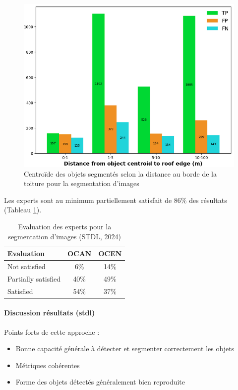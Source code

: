 \begin{figure}[H]
    \centering
    \includegraphics[width=1\linewidth]{02-main//figures/ch2/stdl_11_segmentation_image_distance.png}
    \caption{Centroïde des objets segmentés selon la distance au borde de la toiture pour la segmentation d’images  \cite{herny_detection_2024}}
    \label{fig:stdl_11_segmentation_image_distance}
\end{figure}

Les experts sont au minimum partiellement satisfait de 86\% des résultats (Tableau \ref{tab:stdl_07_segmentation_image_resultats_experts}).
\begin{table}[h]
    \centering
    \begin{tabular}{|l|c|c|}
    \hline
    Evaluation & OCAN & OCEN \\
    \hline
    Not satisfied & 6\% & 14\% \\
    Partially satisfied & 40\% & 49\% \\
    Satisfied & 54\% & 37\% \\
    \hline
    \end{tabular}
    \caption{Evaluation des experts pour la segmentation d'images (STDL, 2024)}
    \label{tab:stdl_07_segmentation_image_resultats_experts}
\end{table}
\newpage
\paragraph{Discussion résultats (\acrshort{stdl})}

\par{Points forts de cette approche :}
\begin{itemize}
\item Bonne capacité générale à détecter et segmenter correctement les objets
\item Métriques cohérentes
\item Forme des objets détectés généralement bien reproduite
\end{itemize}


